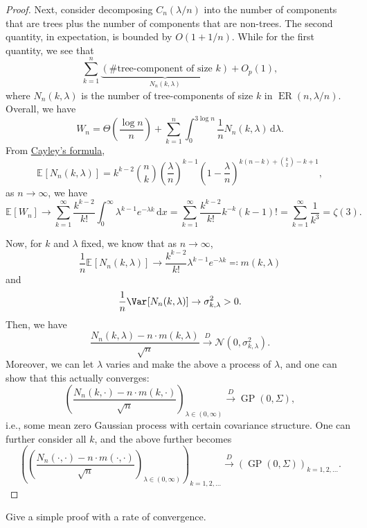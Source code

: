 \begin{proof}
	Next, consider decomposing \(C_n(\lambda / n)\) into the number of components that are trees plus the number of components that are non-trees. The second quantity, in expectation, is bounded by \(O(1+ 1 / n)\). While for the first quantity, we see that
	\[
		\sum_{k=1}^{n} \underbrace{( \text{\#tree-component of size \(k\)} )}_{N_n(k, \lambda )} + O_p(1),
	\]
	where \(N_n(k, \lambda )\) is the number of tree-components of size \(k\) in \(\operatorname{ER}(n, \lambda / n) \). Overall, we have
	\[
		W_n
		= \Theta \left( \frac{\log n}{n} \right) + \sum_{k=1}^{n} \int_{0}^{3 \log n} \frac{1}{n} N_n(k, \lambda ) \,\mathrm{d}\lambda.
	\]
	From \hyperref[thm:Cayley-formula]{Cayley's formula},
	\[
		\mathbb{E}_{}[N_n(k, \lambda )]
		= k^{k-2} \binom{n}{k} \left( \frac{\lambda}{n} \right) ^{k-1} \left( 1 - \frac{\lambda}{n} \right) ^{k(n-k) + \binom{k}{2} - k + 1},
	\]
	as \(n \to \infty \), we have
	\[
		\mathbb{E}_{}[W_n]
		\to \sum_{k=1}^{\infty} \frac{k^{k-2}}{k!} \int_{0}^{\infty} \lambda ^{k-1} e^{-\lambda k} \,\mathrm{d}x
		= \sum_{k=1}^{\infty} \frac{k^{k-2}}{k!} k^{- k} (k-1)!
		= \sum_{k=1}^{\infty} \frac{1}{k^3}
		= \zeta (3).
	\]

	Now, for \(k\) and \(\lambda \) fixed, we know that as \(n \to \infty \),
	\[
		\frac{1}{n}\mathbb{E}_{}[N_n(k, \lambda )]
		\to \frac{k^{k-2}}{k!} \lambda ^{k-1} e^{-\lambda k}
		\eqqcolon m(k, \lambda )
	\]
	and
	\[
		\frac{1}{n} \Var_{}[N_n(k, \lambda )]
		\to \sigma _{k, \lambda }^2
		> 0.
	\]
	Then, we have
	\[
		\frac{N_n(k, \lambda ) - n \cdot m(k, \lambda )}{\sqrt{n} }
		\overset{D}{\to} \mathcal{N} (0, \sigma _{k, \lambda }^2).
	\]
	Moreover, we can let \(\lambda \) varies and make the above a process of \(\lambda \), and one can show that this actually converges:
	\[
		\left( \frac{N_n(k, \cdot ) - n \cdot m(k, \cdot )}{\sqrt{n} } \right) _{\lambda \in (0, \infty )}
		\overset{D}{\to} \operatorname{GP}(0, \Sigma ),
	\]
	i.e., some mean zero Gaussian process with certain covariance structure. One can further consider all \(k\), and the above further becomes
	\[
		\left( \left( \frac{N_n(\cdot , \cdot ) - n \cdot m(\cdot, \cdot )}{\sqrt{n} } \right) _{\lambda \in (0, \infty )} \right) _{k = 1, 2, \dots }
		\overset{D}{\to} \left( \operatorname{GP}(0, \Sigma ) \right) _{k = 1, 2, \dots }.
	\]
\end{proof}

\begin{exercise}
	Give a simple proof with a rate of convergence.
\end{exercise}

